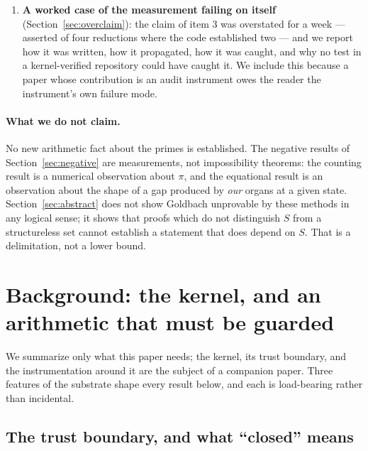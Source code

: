 \documentclass[11pt]{article}
\theoremstyle{remark}\newtheorem{remark}{Remark}
\begin{document}
\begin{enumerate}
(Section~\ref{sec:repro}): a column separating ``closed'' from ``axiom-free'' --- eleven
of eighteen links are free, seven rest on the sieve's two dedicated axioms --- and a
test that fails if anything in the research folder concludes the conjecture.
\item \textbf{A worked case of the measurement failing on itself}
(Section~\ref{sec:overclaim}): the claim of item 3 was overstated for a week --- asserted
of four reductions where the code established two --- and we report how it was written,
how it propagated, how it was caught, and why no test in a kernel-verified repository
could have caught it. We include this because a paper whose contribution is an audit
instrument owes the reader the instrument's own failure mode.
\end{enumerate}

\paragraph{What we do not claim.} No new arithmetic fact about the primes is
established. The negative results of Section~\ref{sec:negative} are measurements, not
impossibility theorems: the counting result is a numerical observation about $\pi$, and
the equational result is an observation about the shape of a gap produced by
\emph{our} organs at a given state. Section~\ref{sec:abstract} does not show Goldbach
unprovable by these methods in any logical sense; it shows that proofs which do not
distinguish $S$ from a structureless set cannot establish a statement that does depend
on $S$. That is a delimitation, not a lower bound.

\section{Background: the kernel, and an arithmetic that must be guarded}
\label{sec:background}

We summarize only what this paper needs; the kernel, its trust boundary, and the
instrumentation around it are the subject of a companion paper. Three features of the
substrate shape every result below, and each is load-bearing rather than incidental.

\subsection{The trust boundary, and what ``closed'' means}
\end{document}
